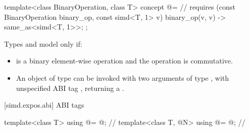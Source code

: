 \begin{itemdecl}
template<class BinaryOperation, class T>
  concept @\reductionoperation@ =  // \expos
    requires (const BinaryOperation binary_op, const simd<T, 1> v) {
      { binary_op(v, v) } -> same_as<simd<T, 1>>;
    };
\end{itemdecl}
\begin{itemdescr}
\pnum
Types  and  model 
only if:
\begin{itemize}
  \item {} is a binary element-wise operation and the operation is commutative.

  \item An object of type  can be invoked with two arguments of type
    , with unspecified ABI tag , returning a .
\end{itemize}
\end{itemdescr}

[simd.expos.abi]{ ABI tags}

\begin{itemdecl}
template<class T> using @\nativeabi@ = @\seebelow@; // \expos
template<class T, @\simdsizetype@ N> using @\deducet@ = @\seebelow@; // \expos
\end{itemdecl}

